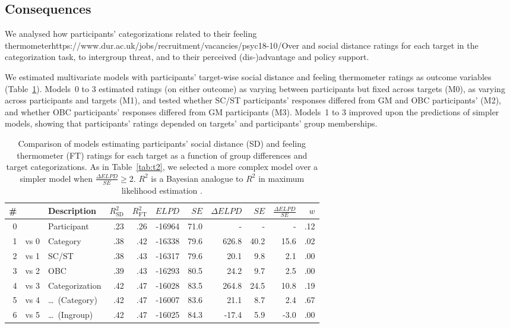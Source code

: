 \documentclass[12pt, a4paper]{article}
\begin{document}
\subsection{Consequences}

We analysed how participants' categorizations related to their feeling thermometerhttps://www.dur.ac.uk/jobs/recruitment/vacancies/psyc18-10/Over and social distance ratings for each target in the categorization task, to intergroup threat, and to their perceived (dis-)advantage and policy support.

We estimated multivariate models with participants' target-wise social distance and feeling thermometer ratings as outcome variables (Table~\ref{tab:t3}). Models~0 to 3 estimated ratings (on either outcome) as varying between participants but fixed across targets (M0), as varying across participants and targets (M1), and tested whether SC/ST participants' responses differed from GM and OBC participants' (M2), and whether OBC participants' responses differed from GM participants (M3). Models~1 to 3 improved upon the predictions of simpler models, showing that participants' ratings depended on targets' and participants' group memberships.

\begin{table}
\caption{Comparison of models estimating participants' social distance (SD) and feeling thermometer (FT) ratings for each target as a function of group differences and target categorizations. As in Table~\ref{tab:t2}, we selected a more complex model over a simpler model when $\frac{\Delta\textit{ELPD}}{\textit{SE}} \geq 2$. $R^2$ is a Bayesian analogue to $R^2$ in maximum likelihood estimation \protect{}.}
\centering
{}
\small	
\begin{tabularx}{\linewidth}{r@{~}rXrrrrrrrr} \toprule
\# &  & Description & $R^2_\text{SD}$ & $R^2_\text{FT}$ & $\textit{ELPD}$ & $\textit{SE}$ & $\Delta\textit{ELPD}$ & $\textit{SE}$ & $\frac{\Delta\textit{ELPD}}{\textit{SE}}$ & $w$ \\ \midrule 
0 &      & Participant & .23 & .26 & -16964 & 71.0 & - & - & - & .12 \\
1 & vs 0 & Category & .38 & .42 & -16338 & 79.6 & 626.8 & 40.2 & 15.6 & .02 \\
2 & vs 1 & SC/ST    & .38 & .43 & -16317 & 79.6 &  20.1 &  9.8 &  2.1 & .00 \\
3 & vs 2 & OBC      & .39 & .43 & -16293 & 80.5 &  24.2 &  9.7 &  2.5 & .00 \\ \midrule
4 & vs 3 & Categorization    & .42 & .47 & -16028 & 83.5 & 264.8 & 24.5 & 10.8 & .19 \\
5 & vs 4 & \ldots~(Category) & .42 & .47 & -16007 & 83.6 &  21.1 &  8.7 &  2.4 & .67 \\
6 & vs 5 & \ldots~(Ingroup)  & .42 & .47 & -16025 & 84.3 & -17.4 &  5.9 & -3.0 & .00 \\
\bottomrule    
\end{tabularx}
\label{tab:t3}
\end{table}
\end{document}

